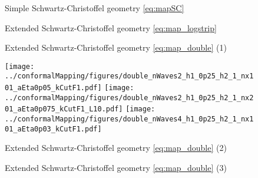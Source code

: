 \begin{figure}[h!ptb]%
\centering
{}%
{\vrule width 1pt}%
%
\caption{Simple Schwartz-Christoffel geometry \eqref{eq:mapSC}}%
\label{fig:res:simple}%
\end{figure}


\begin{figure}[h!ptb]%
\centering
{}%
{\vrule width 1pt}%
%
\caption{Extended Schwartz-Christoffel geometry \eqref{eq:map_logstrip}}%
\label{fig:res:logstip}%
\end{figure}

\begin{figure}[h!ptb]%
\centering
{}%
{\vrule width 1pt}%
\caption{Extended Schwartz-Christoffel geometry \eqref{eq:map_double} (1)}%
\label{fig:res:double1}%
\end{figure}
\begin{figure}[h!ptb]%
\centering
{\texttt{[image: ../conformalMapping/figures/double\_nWaves2\_h1\_0p25\_h2\_1\_nx101\_aEta0p05\_kCutF1.pdf]}}%
{\texttt{[image: ../conformalMapping/figures/double\_nWaves2\_h1\_0p25\_h2\_1\_nx201\_aEta0p075\_kCutF1\_L10.pdf]}}
{\texttt{[image: ../conformalMapping/figures/double\_nWaves4\_h1\_0p25\_h2\_1\_nx101\_aEta0p03\_kCutF1.pdf]}}
\caption{Extended Schwartz-Christoffel geometry \eqref{eq:map_double} (2)}%
\label{fig:res:double2}%
\end{figure}
\begin{figure}[h!ptb]%
\centering
{}
{\vrule width 1pt}%
%
\caption{Extended Schwartz-Christoffel geometry \eqref{eq:map_double} (3)}%
\label{fig:res:double3}%
\end{figure}



